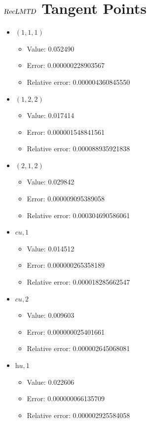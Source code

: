 \documentclass{article}%
\begin{document}
\section{$\textsl{RecLMTD}$ Tangent Points}%
\thispagestyle{plain}%
\begin{itemize}%
	\item $(1, 1, 1)$%
	\begin{itemize}%
		\item Value: 0.052490%
		\item Error: 0.000000228903567%
		\item Relative error: 0.000004360845550%
	\end{itemize}%
	\item $(1, 2, 2)$%
	\begin{itemize}%
		\item Value: 0.017414%
		\item Error: 0.000001548841561%
		\item Relative error: 0.000088935921838%
	\end{itemize}%
	\item $(2, 1, 2)$%
	\begin{itemize}%
		\item Value: 0.029842%
		\item Error: 0.000009095389058%
		\item Relative error: 0.000304690586061%
	\end{itemize}%
	\item $\textit{cu},1$%
	\begin{itemize}%
		\item Value: 0.014512%
		\item Error: 0.000000265358189%
		\item Relative error: 0.000018285662547%
	\end{itemize}%
	\item $\textit{cu},2$%
	\begin{itemize}%
		\item Value: 0.009603%
		\item Error: 0.000000025401661%
		\item Relative error: 0.000002645068081%
	\end{itemize}%
	\item $\textit{hu},1$%
	\begin{itemize}%
		\item Value: 0.022606%
		\item Error: 0.000000066135709%
		\item Relative error: 0.000002925584058%
	\end{itemize}%
\end{itemize}%
\end{document}
